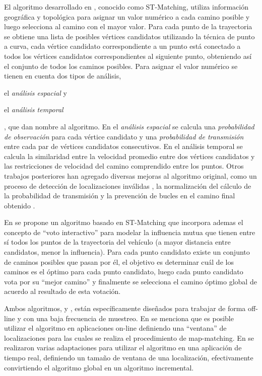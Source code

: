 El algoritmo desarrollado en \cite{lou2009map}, conocido como ST-Matching, utiliza información geográfica y topológica para asignar un valor numérico a cada camino posible y luego selecciona al camino con el mayor valor. Para cada punto de la trayectoria se obtiene una lista de posibles vértices candidatos utilizando la técnica de punto a curva, cada vértice candidato correspondiente a un punto está conectado a todos los vértices candidatos correspondientes al siguiente punto, obteniendo así el conjunto de todos los caminos posibles. Para asignar el valor numérico se tienen en cuenta dos tipos de análisis, \begin{enumerate*}[a)] \item el \emph{análisis espacial} y \item el \emph{análisis temporal}\end{enumerate*}, que dan nombre al algoritmo. En el \emph{análisis espacial} se calcula una \emph{probabilidad de observación} para cada vértice candidato y una \emph{probabilidad de transmisión} entre cada par de vértices candidatos consecutivos. En el análisis temporal se calcula la similaridad entre la velocidad promedio entre dos vértices candidatos y las restricciones de velocidad del camino comprendido entre los puntos. Otros trabajos posteriores han agregado diversas mejoras al algoritmo original, como un proceso de detección de localizaciones inválidas \cite{sakic2012map}, la normalización del cálculo de la probabilidad de transmisión y la prevención de bucles en el camino final obtenido \cite{budigm2012algorithm}.


En \cite{yuan2010interactive} se propone un algoritmo basado en ST-Matching que incorpora ademas el concepto de “voto interactivo” para modelar la influencia mutua que tienen entre sí todos los puntos de la trayectoria del vehículo (a mayor distancia entre candidatos, menor la influencia). Para cada punto candidato existe un conjunto de caminos posibles que pasan por él, el objetivo es determinar cuál de los caminos es el óptimo para cada punto candidato, luego cada punto candidato vota por su “mejor camino” y finalmente se selecciona el camino óptimo global de acuerdo al resultado de esta votación.

Ambos algoritmos, \cite{lou2009map} y \cite{yuan2010interactive}, están específicamente diseñados para trabajar de forma off-line y con una baja frecuencia de muestreo. En \cite{lou2009map} se  menciona que es posible utilizar el algoritmo en aplicaciones on-line definiendo una “ventana” de localizaciones para las cuales se realiza el procedimiento de map-matching. En \cite{sakic2012map} se realizaron varias adaptaciones para utilizar el algoritmo en una aplicación de tiempo real, definiendo un tamaño de ventana de una localización, efectivamente convirtiendo el algoritmo global en un algoritmo incremental.

